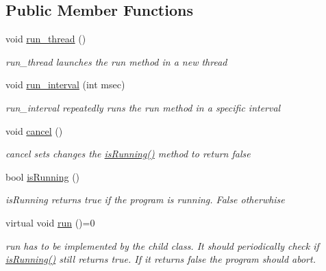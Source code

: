 \subsection*{Public Member Functions}
\begin{DoxyCompactItemize}
\item 
\hypertarget{classdrobot_1_1program_1_1Runnable_afb99260eed1ee96fa96bf0a8ee03cfa5}{void \hyperlink{classdrobot_1_1program_1_1Runnable_afb99260eed1ee96fa96bf0a8ee03cfa5}{run\-\_\-thread} ()}\label{classdrobot_1_1program_1_1Runnable_afb99260eed1ee96fa96bf0a8ee03cfa5}

\begin{DoxyCompactList}\small\item\em run\-\_\-thread launches the run method in a new thread \end{DoxyCompactList}\item 
void \hyperlink{classdrobot_1_1program_1_1Runnable_ab453a9fcd85639e3c14f210e54d050b7}{run\-\_\-interval} (int msec)
\begin{DoxyCompactList}\small\item\em run\-\_\-interval repeatedly runs the run method in a specific interval \end{DoxyCompactList}\item 
\hypertarget{classdrobot_1_1program_1_1Runnable_a38595b3d0b4bf3c9ebcceb3dd6e5fdcc}{void \hyperlink{classdrobot_1_1program_1_1Runnable_a38595b3d0b4bf3c9ebcceb3dd6e5fdcc}{cancel} ()}\label{classdrobot_1_1program_1_1Runnable_a38595b3d0b4bf3c9ebcceb3dd6e5fdcc}

\begin{DoxyCompactList}\small\item\em cancel sets changes the \hyperlink{classdrobot_1_1program_1_1Runnable_ab22aef578839f56051702094b6f768df}{is\-Running()} method to return false \end{DoxyCompactList}\item 
bool \hyperlink{classdrobot_1_1program_1_1Runnable_ab22aef578839f56051702094b6f768df}{is\-Running} ()
\begin{DoxyCompactList}\small\item\em is\-Running returns true if the program is running. False otherwhise \end{DoxyCompactList}\item 
\hypertarget{classdrobot_1_1program_1_1Runnable_abbfe663f564dcfb5cfa157f59a56ed0d}{virtual void \hyperlink{classdrobot_1_1program_1_1Runnable_abbfe663f564dcfb5cfa157f59a56ed0d}{run} ()=0}\label{classdrobot_1_1program_1_1Runnable_abbfe663f564dcfb5cfa157f59a56ed0d}

\begin{DoxyCompactList}\small\item\em run has to be implemented by the child class. It should periodically check if \hyperlink{classdrobot_1_1program_1_1Runnable_ab22aef578839f56051702094b6f768df}{is\-Running()} still returns true. If it returns false the program should abort. \end{DoxyCompactList}\end{DoxyCompactItemize}
